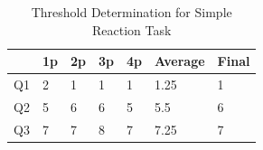 \begin{table}[h]
\centering
\caption{Threshold Determination for Simple Reaction Task}\newline
\captionsetup[table]{skip=10pt}
\label{}

{
\begin{tabular}{lllllll}
\hline
   & 1p & 2p & 3p & 4p & Average & Final \\ \hline
Q1 & 2  & 1  & 1  & 1  & 1.25    & 1     \\
Q2 & 5  & 6  & 6  & 5  & 5.5     & 6     \\
Q3 & 7  & 7  & 8  & 7  & 7.25    & 7     \\ \hline
\end{tabular}
}
\label{table:threshold}
\end{table}